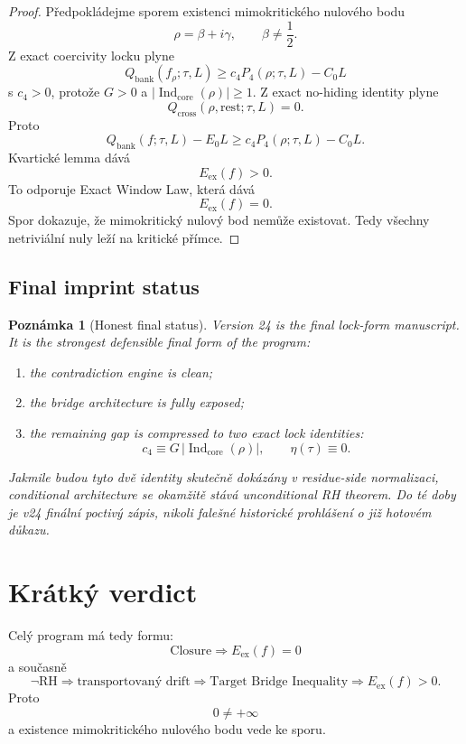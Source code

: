 \documentclass[11pt,a4paper]{article}
\newtheorem{remark}[theorem]{Poznámka}
\begin{document}
\begin{proof}
Předpokládejme sporem existenci mimokritického nulového bodu
\[
\rho=\beta+i\gamma,
\qquad
\beta\neq \frac12.
\]
Z exact coercivity locku plyne
\[
Q_{\mathrm{bank}}(f_\rho;\tau,L)\ge c_4P_4(\rho;\tau,L)-C_0L
\]
s \(c_4>0\), protože \(G>0\) a \(|\operatorname{Ind}_{\mathrm{core}}(\rho)|\ge 1\).
Z exact no-hiding identity plyne
\[
Q_{\mathrm{cross}}(\rho,\mathrm{rest};\tau,L)=0.
\]
Proto
\[
Q_{\mathrm{bank}}(f;\tau,L)-E_0L
\ge
c_4P_4(\rho;\tau,L)-C_0L.
\]
Kvartické lemma dává
\[
E_{\mathrm{ex}}(f)>0.
\]
To odporuje Exact Window Law, která dává
\[
E_{\mathrm{ex}}(f)=0.
\]
Spor dokazuje, že mimokritický nulový bod nemůže existovat. Tedy všechny netriviální nuly
leží na kritické přímce.
\end{proof}

\subsection*{Final imprint status}

\begin{remark}[Honest final status]
Version 24 is the final lock-form manuscript.
It is the strongest defensible final form of the program:
\begin{enumerate}[label=\textbf{(\arabic*)}]
    \item the contradiction engine is clean;
    \item the bridge architecture is fully exposed;
    \item the remaining gap is compressed to two exact lock identities:
    \[
    c_4 \equiv G\,|\operatorname{Ind}_{\mathrm{core}}(\rho)|,
    \qquad
    \eta(\tau)\equiv 0.
    \]
\end{enumerate}
Jakmile budou tyto dvě identity skutečně dokázány v residue-side normalizaci,
conditional architecture se okamžitě stává unconditional RH theorem.
Do té doby je v24 finální poctivý zápis, nikoli falešné historické prohlášení o již hotovém důkazu.
\end{remark}


\section{Krátký verdict}

Celý program má tedy formu:
\[
\boxed{
\text{Closure} \Longrightarrow E_{\mathrm{ex}}(f)=0
}
\]
a současně
\[
\boxed{
\neg \mathrm{RH}
\Longrightarrow
\text{transportovaný drift}
\Longrightarrow
\text{Target Bridge Inequality}
\Longrightarrow
E_{\mathrm{ex}}(f)>0.
}
\]
Proto
\[
0\neq +\infty
\]
a existence mimokritického nulového bodu vede ke sporu.
\end{document}
